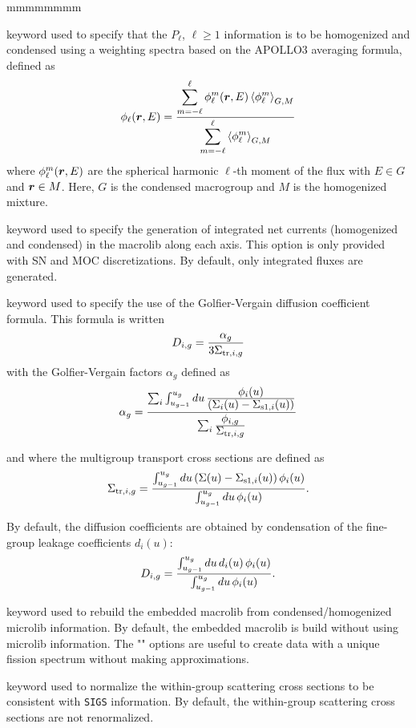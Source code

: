 \begin{ListeDeDescription}{mmmmmmmm}
\item[\moc{PNW\_SP}] keyword used to specify that the $P_\ell$, $\ell\ge 1$ information is to be
homogenized and condensed using a weighting spectra based on the APOLLO3 averaging formula\cite{condPn}, defined as
$$
\phi_\ell(\bff(r),E)={ \displaystyle\sum_{m=-\ell}^\ell \phi_\ell^m(\bff(r),E) \left<\phi_\ell^m\right>_{G,M} \over \displaystyle\sum_{m=-\ell}^\ell \left<\phi_\ell^m\right>_{G,M} }
$$
where $\phi_\ell^m(\bff(r),E)$ are the spherical harmonic $\ell$-th moment of the flux with $E \in G$ and $\bff(r) \in M$. Here, $G$ is the
condensed macrogroup and $M$ is the homogenized mixture.

\item[\moc{EDI\_CURR}] keyword used to specify the generation of integrated net currents (homogenized and condensed) in the macrolib along each axis.
This option is only provided with SN and MOC discretizations. By default, only integrated fluxes are generated.

\item[\moc{GOLVER}] keyword used to specify the use of the Golfier-Vergain diffusion coefficient formula. This formula is written
$$D_{i,g}={\alpha_g\over 3\Sigma_{{\rm tr},i,g}}$$
\noindent with the Golfier-Vergain factors $\alpha_g$ defined as
$$\alpha_g={\sum_i  \int_{u_{g-1}}^{u_g} du \, {\displaystyle\phi_i(u) \over \displaystyle\left(\Sigma_i(u)-\Sigma_{{\rm s1},i}(u) \right) }
\over \sum_i {\displaystyle\phi_{i,g} \over \displaystyle\Sigma_{{\rm tr},i,g}} }$$

and where the multigroup transport cross sections are defined as
$$\Sigma_{{\rm tr},i,g}={\int_{u_{g-1}}^{u_g} du \left(\Sigma(u) -\Sigma_{{\rm s1},i}(u) \right) \phi_i(u)
\over \int_{u_{g-1}}^{u_g} du \, \phi_i(u) }.$$

By default, the diffusion coefficients are obtained by condensation of the fine-group leakage coefficients $d_i(u)$:
$$D_{i,g}={\int_{u_{g-1}}^{u_g} du \, d_i(u) \, \phi_i(u) \over \int_{u_{g-1}}^{u_g} du \, \phi_i(u) }.$$

\item[\moc{REBUILD}] keyword used to rebuild the embedded macrolib from condensed/homogenized microlib information. By default, the embedded macrolib
is build without using microlib information. The "" options are useful to create  data with a unique fission spectrum
without making approximations.

\item[\moc{WNORM}] keyword used to normalize the within-group scattering cross sections to be consistent with {\tt SIGS} information. By default,
the within-group scattering cross sections are not renormalized.


\end{ListeDeDescription}

